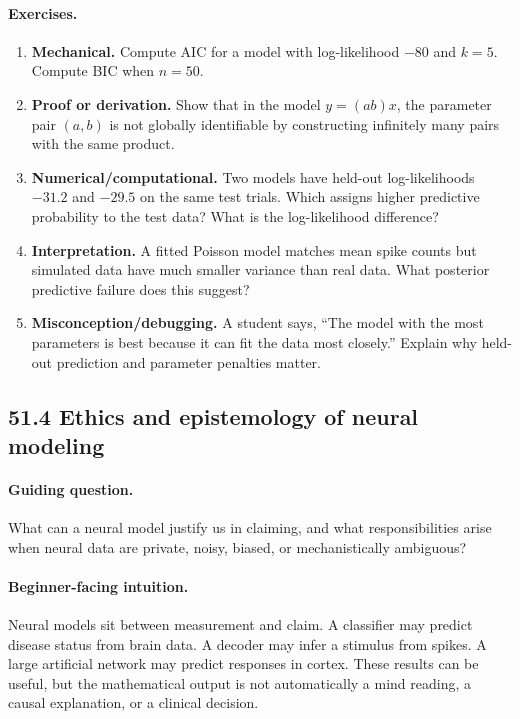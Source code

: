 \paragraph{Exercises.}
\begin{enumerate}[label=\textbf{51.3.\arabic*.}, leftmargin=*]
\item \textbf{Mechanical.} Compute AIC for a model with log-likelihood \(-80\) and \(k=5\). Compute BIC when \(n=50\).
\item \textbf{Proof or derivation.} Show that in the model \(y=(ab)x\), the parameter pair \((a,b)\) is not globally identifiable by constructing infinitely many pairs with the same product.
\item \textbf{Numerical/computational.} Two models have held-out log-likelihoods \(-31.2\) and \(-29.5\) on the same test trials. Which assigns higher predictive probability to the test data? What is the log-likelihood difference?
\item \textbf{Interpretation.} A fitted Poisson model matches mean spike counts but simulated data have much smaller variance than real data. What posterior predictive failure does this suggest?
\item \textbf{Misconception/debugging.} A student says, ``The model with the most parameters is best because it can fit the data most closely.'' Explain why held-out prediction and parameter penalties matter.
\end{enumerate}

\subsection{51.4 Ethics and epistemology of neural modeling}

\paragraph{Guiding question.}
What can a neural model justify us in claiming, and what responsibilities arise when neural data are private, noisy, biased, or mechanistically ambiguous?

\paragraph{Beginner-facing intuition.}
Neural models sit between measurement and claim. A classifier may predict disease status from brain data. A decoder may infer a stimulus from spikes. A large artificial network may predict responses in cortex. These results can be useful, but the mathematical output is not automatically a mind reading, a causal explanation, or a clinical decision.

